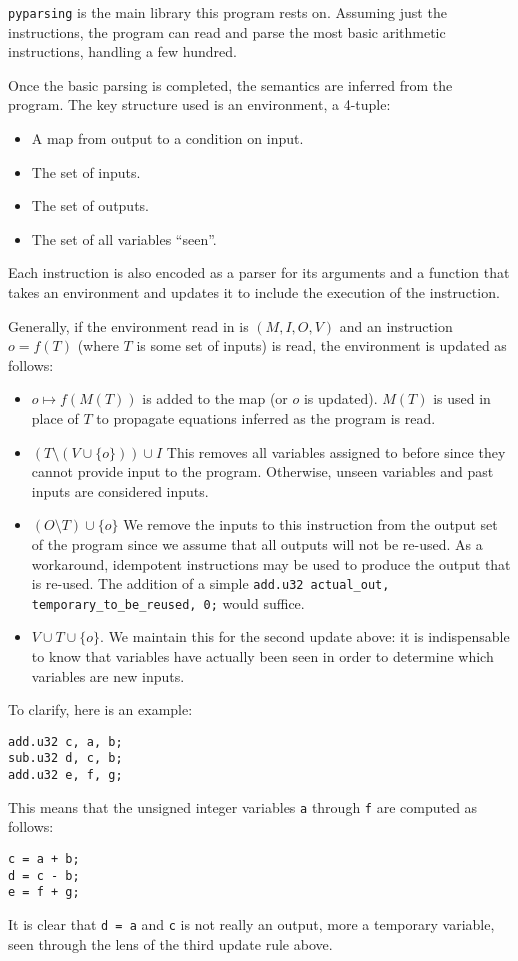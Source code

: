 \documentclass[letterpaper,twocolumn,10pt]{article}
\begin{document}
\texttt{pyparsing} is the main library this program rests on.
Assuming just the instructions, the program can read and parse
the most basic arithmetic instructions, handling a few hundred.

Once the basic parsing is completed, the semantics are inferred from the program.
The key structure used is an environment, a 4-tuple:
\begin{itemize}
    \item A map from output to a condition on input.
    \item The set of inputs.
    \item The set of outputs.
    \item The set of all variables ``seen''.
\end{itemize}

Each instruction is also encoded as a parser for its arguments
and a function that takes an environment and updates it to
include the execution of the instruction.

Generally, if the environment read in is $(M, I, O, V)$ and
an instruction $o = f(T)$ (where $T$ is some set of inputs)
is read, the environment is updated as follows:
\begin{itemize}
    \item $o \mapsto f(M(T))$ is added to the map (or $o$ is updated).
        $M(T)$ is used in place of $T$ to propagate equations inferred
        as the program is read.
    \item $(T \setminus (V \cup \{o\})) \cup I$
        This removes all variables assigned to before since they
        cannot provide input to the program. Otherwise, unseen variables
        and past inputs are considered inputs.
    \item $(O \setminus T) \cup \{o\}$
        We remove the inputs to this instruction from the output set of
        the program since we assume that all outputs will not be re-used.
        As a workaround, idempotent instructions may be used to produce the
        output that is re-used. The addition of a simple \texttt{add.u32 actual\_out, temporary\_to\_be\_reused, 0;} would suffice.
    \item $V \cup T \cup \{o\}$.
        We maintain this for the second update above: it is indispensable to
        know that variables have actually been seen in order to determine
        which variables are new inputs.
\end{itemize}

To clarify, here is an example:
\begin{lstlisting}
add.u32 c, a, b;
sub.u32 d, c, b;
add.u32 e, f, g;
\end{lstlisting}
This means that the unsigned integer variables
\texttt{a} through \texttt{f} are computed as follows:
\begin{lstlisting}
c = a + b;
d = c - b;
e = f + g;
\end{lstlisting}
It is clear that \texttt{d = a} and \texttt{c} is not really an
output, more a temporary variable, seen through the lens of the third update
rule above.
\end{document}
